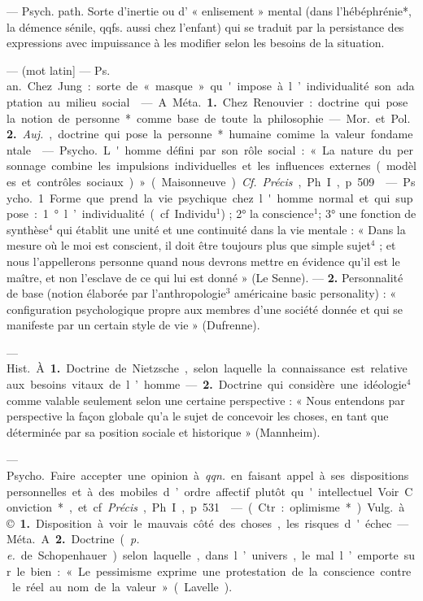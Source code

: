 \begin{itemize}[leftmargin=1cm, label=, itemsep=1pt]
 — Psych. path. Sorte
d'inertie ou d’ « enlisement » mental
(dans l'hébéphrénie*, la démence
sénile, qqfs. aussi chez l'enfant) qui
se traduit par la persistance des
expressions avec impuissance à les
modifier selon les besoins de la situation.

 — (mot latin] — \si{Ps. an.} Chez
Jung : sorte de « masque » qu'impose
à l’individualité son adaptation au
milieu social.

 — A. \si{Méta.} {\bf 1.} Chez
Renouvier : doctrine qui pose la notion de personne* comme base de
toute la philosophie. — \si{Mor.} et \si{Pol.}
 {\bf 2.} {\it Auj.}, doctrine qui pose la personne* humaine comime la valeur
fondamentale.

 — \si{Psycho.} L'homme défini par son rôle social : « La nature
du personnage combine les impulsions individuelles et les influences
externes (modèles et contrôles sociaux) » (Maisonneuve). {\it Cf.} {\it Précis},
Ph. I, p. 509.

 — \si{Psycho.}
1. Forme que prend.la vie psychique
chez l'homme normal et qui suppose : 1° l’individualité (cf. Individu$^1$) ; 2° la conscience$^1$; 3° une
fonction de synthèse$^4$ qui établit une
unité et une continuité dans la vie
mentale : « Dans la mesure où le moi
est conscient, il doit être toujours
plus que simple sujet$^4$ ; et nous l’appellerons personne quand nous devrons mettre en évidence qu'il est
le maître, et non l’esclave de ce qui
lui est donné » (Le Senne). — {\bf 2.} Personnalité
de base (notion élaborée
par l'anthropologie$^3$ américaine
basic personality) : « configuration
psychologique propre aux membres
d’une société donnée et qui se manifeste par un certain style de vie »
(Dufrenne).

 — \si{Hist.} À. {\bf 1.} Doctrine
de Nietzsche, selon laquelle la
connaissance est relative aux besoins
vitaux de l’homme. — {\bf 2.} Doctrine qui
considère une idéologie$^4$ comme
valable seulement selon une certaine perspective : « Nous entendons
par perspective la façon globale qu’a
le sujet de concevoir les choses, en
tant que déterminée par sa position
sociale et historique » (Mannheim).

 — \si{Psycho.} Faire accepter
une opinion à {\it qqn.} en faisant appel
à ses dispositions personnelles et à
des mobiles d’ordre affectif plutôt
qu'intellectuel. Voir Conviction*, et
cf. {\it Précis}, Ph. I, p. 531.

 — (Ctr. : oplimisme*).
\si{Vulg.} à. © {\bf 1.} Disposition à voir le
mauvais côté des choses, les risques
d'échec. — \si{Méta.} A. {\bf 2.} Doctrine
({\it p. e.} de Schopenhauer) selon laquelle,
dans l’univers, le mal l’emporte sur
le bien : « Le pessimisme exprime
une protestation de la conscience
contre le réel au nom de la valeur »
(Lavelle).


\end{itemize}
